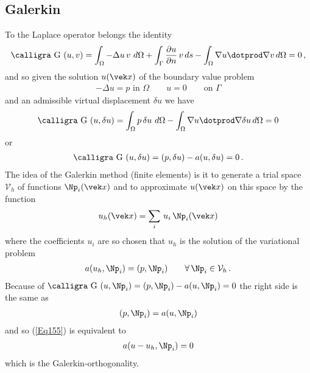 \textcolor{blau2}{\section{Galerkin}}
To the Laplace operator belongs the identity
\begin{align}\label{Eq90}
\text{\normalfont\calligra G\,\,}(u, v) = \int_{\Omega} - \Delta u\,v\,\,d\Omega + \int_{\Gamma} \frac{\partial u}{\partial n}\,v\,ds - \int_{\Omega} \nabla u \dotprod \nabla v\,d\Omega = 0\,,
\end{align}
and so given the solution $u(\vek x)$ of the boundary value problem
\begin{align}
- \Delta u = p\,\,\text{in $\Omega$} \qquad u = 0 \qquad \text{on $\Gamma$}
\end{align}
and an admissible virtual displacement $\delta u$ we have
\begin{align}
\text{\normalfont\calligra G\,\,}(u,\delta u) = \int_{\Omega} p\,\delta u\,\,d\Omega - \int_{\Omega} \nabla u \dotprod \nabla \delta u\,d\Omega= 0
\end{align}
or
\begin{align}
\text{\normalfont\calligra G\,\,}(u,\delta u) = (p, \delta u) - a(u,\delta u) = 0\,.
\end{align}
The idea of the Galerkin method (finite elements) is it to generate a trial space $\mathcal{V}_h$ of functions $\Np_i(\vek x)$ and to approximate $u(\vek x)$ on this space by the function
\begin{align}
u_h(\vek x) = \sum_i\,u_i\,\Np_i(\vek x)
\end{align}
where the coefficients $u_i$ are so chosen that $u_h$ is the solution of the variational problem
\begin{align}\label{Eq155}
a(u_h,\Np_i) = (p,\Np_i) \qquad \forall \,\Np_i \in \mathcal{V}_h\,.
\end{align}
Because of $\text{\normalfont\calligra G\,\,}(u,\Np_i) = (p,\Np_i) - a(u,\Np_i) = 0$ the right side is the same as
\begin{align}
(p, \Np_i) = a(u,\Np_i)
\end{align}
and so (\ref{Eq155}) is equivalent to
\begin{align}
a(u - u_h,\Np_i) = 0
\end{align}
which is the Galerkin-orthogonality.

